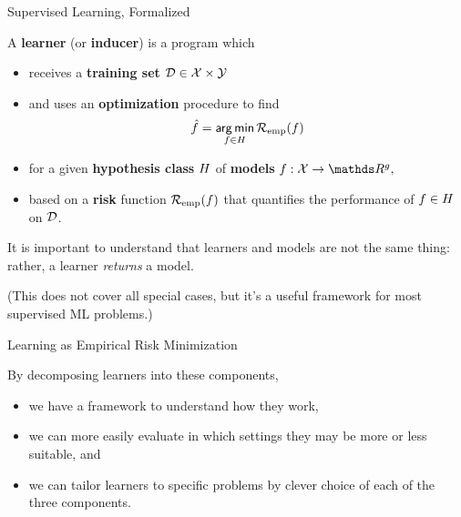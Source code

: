 \documentclass[11pt,compress,t,notes=noshow, xcolor=table]{beamer}
\begin{document}
\begin{vbframe}{Supervised Learning, Formalized}

A \textbf{learner} (or \textbf{inducer}) is a program which

\begin{itemize}

  \item receives a \textbf{training set} $\mathcal{D} \in \mathcal{X} \times \mathcal{Y}$
  
  \item and uses an \textbf{optimization} procedure to find
  $$\hat{f} = \mathop{\sf arg\,min}_{f \in H} \mathcal{R}_{\text{emp}}(f)$$
  
  \item for a given \textbf{hypothesis class} $H$ of \textbf{models} 
  $f:\Xspace \rightarrow \R^g,$
  
  \item based on a \textbf{risk} function $\mathcal{R}_{\text{emp}}(f)$ that quantifies the 
  performance of $f \in H$ on $\mathcal{D}$.

\end{itemize}

\lz 

It is important to understand that learners and models are not the same thing: 
rather, a learner \emph{returns} a model. 

\lz

{\footnotesize (This does not cover all special cases, but it's a useful 
framework for most supervised ML problems.)}

\end{vbframe}


\begin{vbframe}{Learning as Empirical Risk Minimization}

By decomposing learners into these components,

\begin{itemize}

  \item we have a framework to understand how they work,
  
  \item we can more easily evaluate in which settings they may be more or less 
  suitable, and
  
  \item we can tailor learners to specific problems by clever choice of each of 
  the three components.

\end{itemize}

\end{vbframe}
\end{document}
